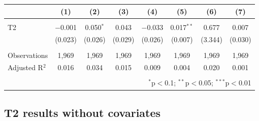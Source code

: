 \documentclass[
  11.5pt,
]{article}
\begin{document}
\begin{table}[!htbp]
\begin{tabular}{@{\extracolsep{5pt}}lccccccc}
\\[-1.8ex] & (1) & (2) & (3) & (4) & (5) & (6) & (7)\\ 
\hline \\[-1.8ex] 
 T2 & $-$0.001 & 0.050$^{*}$ & 0.043 & $-$0.033 & 0.017$^{**}$ & 0.677 & 0.007 \\ 
  & (0.023) & (0.026) & (0.029) & (0.026) & (0.007) & (3.344) & (0.030) \\ 
 \hline \\[-1.8ex] 
Observations & 1,969 & 1,969 & 1,969 & 1,969 & 1,969 & 1,969 & 1,969 \\ 
Adjusted R$^{2}$ & 0.016 & 0.034 & 0.015 & 0.009 & 0.004 & 0.020 & 0.001 \\ 
\hline 
\hline \\[-1.8ex] 
\multicolumn{8}{r}{$^{*}$p$<$0.1; $^{**}$p$<$0.05; $^{***}$p$<$0.01} \\ 
\end{tabular} 
\end{table}

\clearpage

\hypertarget{t2-results-without-covariates}{%
\subsection{T2 results without
covariates}\label{t2-results-without-covariates}}
\end{document}
